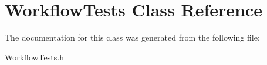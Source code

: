 \hypertarget{interface_workflow_tests}{
\section{\-Workflow\-Tests \-Class \-Reference}
\label{interface_workflow_tests}
}


\-The documentation for this class was generated from the following file\-:\begin{DoxyCompactItemize}
\item 
\-Workflow\-Tests.\-h\end{DoxyCompactItemize}
